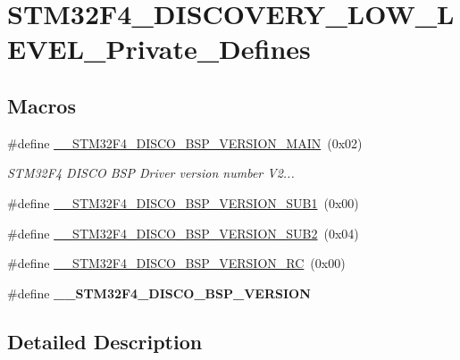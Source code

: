 \hypertarget{group__STM32F4__DISCOVERY__LOW__LEVEL__Private__Defines}{\section{S\-T\-M32\-F4\-\_\-\-D\-I\-S\-C\-O\-V\-E\-R\-Y\-\_\-\-L\-O\-W\-\_\-\-L\-E\-V\-E\-L\-\_\-\-Private\-\_\-\-Defines}
\label{group__STM32F4__DISCOVERY__LOW__LEVEL__Private__Defines}
}
\subsection*{Macros}
\begin{DoxyCompactItemize}
\item 
\#define \hyperlink{group__STM32F4__DISCOVERY__LOW__LEVEL__Private__Defines_ga9b9ce78017b00a5149e65e663676bf1a}{\-\_\-\-\_\-\-S\-T\-M32\-F4\-\_\-\-D\-I\-S\-C\-O\-\_\-\-B\-S\-P\-\_\-\-V\-E\-R\-S\-I\-O\-N\-\_\-\-M\-A\-I\-N}~(0x02)
\begin{DoxyCompactList}\small\item\em S\-T\-M32\-F4 D\-I\-S\-C\-O B\-S\-P Driver version number V2... \end{DoxyCompactList}\item 
\#define \hyperlink{group__STM32F4__DISCOVERY__LOW__LEVEL__Private__Defines_ga53a734726d1b7247bb620a56de8d154e}{\-\_\-\-\_\-\-S\-T\-M32\-F4\-\_\-\-D\-I\-S\-C\-O\-\_\-\-B\-S\-P\-\_\-\-V\-E\-R\-S\-I\-O\-N\-\_\-\-S\-U\-B1}~(0x00)
\item 
\#define \hyperlink{group__STM32F4__DISCOVERY__LOW__LEVEL__Private__Defines_ga56f24ebf9cca2d997596f4eb6aba19fc}{\-\_\-\-\_\-\-S\-T\-M32\-F4\-\_\-\-D\-I\-S\-C\-O\-\_\-\-B\-S\-P\-\_\-\-V\-E\-R\-S\-I\-O\-N\-\_\-\-S\-U\-B2}~(0x04)
\item 
\#define \hyperlink{group__STM32F4__DISCOVERY__LOW__LEVEL__Private__Defines_ga49aad18854e17cbfa696c09b9c02913c}{\-\_\-\-\_\-\-S\-T\-M32\-F4\-\_\-\-D\-I\-S\-C\-O\-\_\-\-B\-S\-P\-\_\-\-V\-E\-R\-S\-I\-O\-N\-\_\-\-R\-C}~(0x00)
\item 
\#define {\bfseries \-\_\-\-\_\-\-S\-T\-M32\-F4\-\_\-\-D\-I\-S\-C\-O\-\_\-\-B\-S\-P\-\_\-\-V\-E\-R\-S\-I\-O\-N}
\end{DoxyCompactItemize}


\subsection{Detailed Description}


